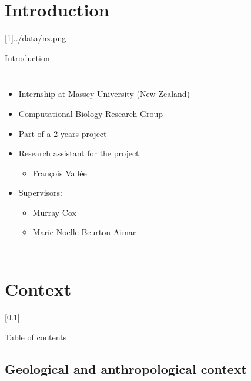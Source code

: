 \documentclass[10pt, aspectratio=43]{beamer}
\begin{document}
\section*{Introduction}
\masseyBrand{}[1]{../data/nz.png}{}{}
\begin{frame}{}{Introduction}
\vspace*{0.5cm}
\begin{columns}
  
  \color{white}
  \begin{itemize}
    \item Internship at Massey University (New Zealand)
    \item Computational Biology Research Group
    \item Part of a 2 years project
    \item Research assistant for the project:
    \begin{itemize}
      \item François Vallée
    \end{itemize}
    \item Supervisors:
    \begin{itemize}
      \item Murray Cox
      \item Marie Noelle Beurton-Aimar
    \end{itemize}
  \end{itemize}

\end{columns}
\end{frame}

\section{Context}
[0.1]{}{}{}
\begin{frame}{}{Table of contents}
\tableofcontents[currentsection, sectionstyle=show/shaded, subsectionstyle=show/show/hide]
\end{frame}

\subsection{Geological and anthropological context}
\begin{frame}{}{}
\end{frame}
\end{document}

